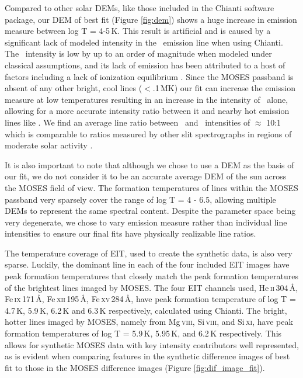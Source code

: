 	Compared to other solar DEMs, like those included in the Chianti software package, our DEM of best fit (Figure \ref{fig:dem}) shows a huge increase in emission measure between log T = 4-5\,K.
	This result is artificial and is caused by a significant lack of modeled intensity in the \heii \ emission line when using Chianti.
    The \heii\ intensity is low by up to an order of magnitude when modeled under classical assumptions, and its lack of emission  has been attributed to a host of factors including a lack of ionization equilibrium \citep{Golding2017}.
	Since the MOSES passband is absent of any other bright, cool lines ($<$.1\,MK) our fit can increase the emission measure at low temperatures resulting in an increase in the intensity of \heii \ alone, allowing for a more accurate intensity ratio between it and nearby hot emission lines like \sixi.
	We find an average line ratio between \heii\ and \sixi\ intensities of $\approx$ 10:1 which is comparable to ratios measured by other slit spectrographs in regions of moderate solar activity \citep{Cushman1978}.
	
	It is also important to note that although we chose to use a DEM as the basis of our fit, we do not consider it to be an accurate average DEM of the sun across the MOSES field of view.
	The formation temperatures of lines within the MOSES passband very sparsely cover the range of log T = 4 - 6.5, allowing multiple DEMs to represent the same spectral content.
	Despite the parameter space being very degenerate, we chose to vary emission measure rather than individual line intensities to ensure our final fits have physically realizable line ratios.
	
	The temperature coverage of EIT, used to create the synthetic data, is also very sparse.
	Luckily, the dominant line in each of the four included EIT images have peak formation temperatures that closely match the peak formation temperatures of the brightest lines imaged by MOSES.  
	The four EIT channels used, He\,\textsc{ii}\,304\,\AA, Fe\,\textsc{ix}\,171\,\AA,  Fe\,\textsc{xii}\,195\,\AA, Fe\,\textsc{xv}\,284\,\AA, have peak formation temperature of log T = 4.7\,K, 5.9\,K, 6.2\,K and 6.3\,K respectively, calculated using Chianti.  
	The bright, hotter lines imaged by MOSES, namely from Mg\,\textsc{viii}, Si\,\textsc{viii}, and Si\,\textsc{xi}, have peak formation temperatures of log T = 5.9\,K, 5.95\,K, and 6.2\,K respectively. 
	This allows for synthetic MOSES data with key intensity contributors well represented, as is evident when comparing features in the synthetic difference images of best fit to those in the MOSES difference images (Figure \ref{fig:dif_image_fit}).
	

